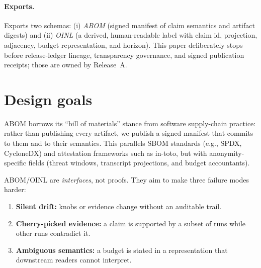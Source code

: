 \documentclass[11pt]{article}
\begin{document}
\paragraph{Exports.}
Exports two schemas: (i) \emph{ABOM} (signed manifest of claim semantics and artifact digests) and
(ii) \emph{OINL} (a derived, human-readable label with claim id, projection, adjacency, budget representation, and horizon).
This paper deliberately stops before release-ledger lineage, transparency governance, and signed publication receipts; those are owned by Release~A.\cite{series:releaseproperty}

\section{Design goals}
ABOM borrows its ``bill of materials'' stance from software supply-chain practice: rather than publishing every artifact, we publish a signed manifest that commits to them and to their semantics.
This parallels SBOM standards (e.g., SPDX, CycloneDX) and attestation frameworks such as in-toto, but with anonymity-specific fields (threat windows, transcript projections, and budget accountants).\cite{ntiaSBOM2019,spdx301,cyclonedx,intoto2019}

ABOM/OINL are \emph{interfaces}, not proofs.
They aim to make three failure modes harder:
\begin{enumerate}[leftmargin=*]
\item \textbf{Silent drift:} knobs or evidence change without an auditable trail.
\item \textbf{Cherry-picked evidence:} a claim is supported by a subset of runs while other runs contradict it.
\item \textbf{Ambiguous semantics:} a budget is stated in a representation that downstream readers cannot interpret.
\end{enumerate}
\end{document}
